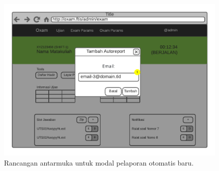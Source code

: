     \begin{figure}
        \centering
        \includegraphics[width=0.75\paperwidth]{Gambar/mockups/Mockup--Admin - Tambah Autoreport.pdf}
        \caption{Rancangan antarmuka untuk modal pelaporan otomatis baru.}
        \label{fig:mockup_admin_exam_det_autoreport}
    \end{figure}
    

